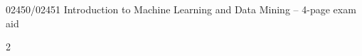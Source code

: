 \documentclass[12pt,a4paper]{article}
\begin{document}
\pagestyle{empty}
\begin{center}
{\large 02450/02451 Introduction to Machine Learning and Data Mining -- 4-page exam aid}
\end{center}
\vspace{-6pt}
\begin{multicols*}{2}







\end{multicols*}
\end{document}
